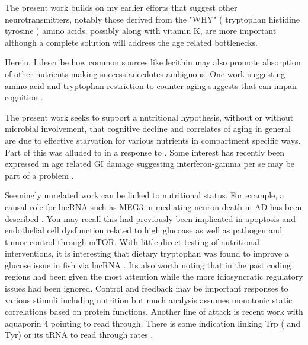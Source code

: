 \documentclass[aps,secnumarabic,balancelastpage,amsmath,amssymb,nofootinbib]{revtex4}
\begin{document}

The present work builds on my earlier efforts 
that suggest other neurotransmitters, notably
those derived from the "WHY" ( tryptophan histidine tyrosine ) 
amino acids, possibly along with
vitamin K, are more important although a complete solution
will address the age related bottlenecks. 

Herein, I describe how common sources
like lecithin may also promote absorption of other nutrients
making success anecdotes ambiguous.  
One work suggesting amino acid and tryptophan restriction
to counter aging suggests that can impair cognition
\cite{CANFIELD201970}.

The present work seeks to support a nutritional hypothesis,
without or without microbial involvement,  that
cognitive decline and correlates of aging in general are due
to effective starvation for various nutrients in compartment
specific ways. Part of this was alluded to in a response to
\mjmdisease \cite{mmarchywka-MJM-2020-002-0.10}
\cite{mmarchywka-MJM-2020-002-0.12rg}. 
Some interest has recently been expressed in age
related GI damage suggesting interferon-gamma per se
may be part of a problem 
\cite{Omrani_Krepelova_Rasa_IFNupgamma_Stat1_axis_drives_2023}.

Seemingly unrelated work can be linked to nutritional status.
For example, a  causal role for lncRNA such as MEG3
in mediating neuron death in AD has been described
\cite{Balusu_Horre_Thrupp_MEG3_activates_necroptosis_2023}.
You may recall this had previously been implicated
in apoptosis and endothelial cell dysfunction 
related to high glucoase \cite{PMC6958101}
\cite{Tong_Peng_Gu_LncRNA_MEG3_alleviates_high_2019}
as well as pathogen 
\cite{Pawar_Hanisch_PalmaVera_Down_regulated_lncRNA_MEG3_2016}
and tumor control \cite{YAN2023109340} through mTOR. 
With little direct testing of nutritional interventions,
it is interesting that 
 dietary tryptophan was found to improve  a glucose issue 
in fish via lncRNA \cite{JIA2021737256}.
Its also worth noting that in the past  coding regions 
had been given the most
attention while the more idiosyncratic regulatory issues
had been ignored. Control and feedback may be important responses
to various stimuli including nutrition but much analysis 
assumes monotonic static correlations based on protein functions. 
Another line of attack is recent work with aquaporin 4 pointing 
to read through\cite{PMC10566184}.
There is some indication linking Trp ( and Tyr)  or its tRNA 
to read through rates \cite{PMC8136774}.
\end{document}
